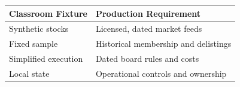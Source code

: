 \begin{tabular}{@{}P{4.0cm}P{8.5cm}@{}}
\toprule
\textbf{Classroom Fixture} & \textbf{Production Requirement} \\
\midrule
Synthetic stocks & Licensed, dated market feeds \\
Fixed sample & Historical membership and delistings \\
Simplified execution & Dated board rules and costs \\
Local state & Operational controls and ownership \\
\bottomrule
\end{tabular}
